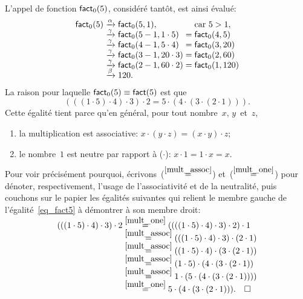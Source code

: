 L'appel de fonction \(\textsf{fact}_0(5)\), considéré tantôt, est ainsi
évalué:
\begin{equation*}
\begin{array}{r@{\;}c@{\;}l@{\;}c@{\;}l}
\fun{fact}_0(5)
& \xrightarrow{\smash[t]{\alpha}} & \fun{fact}_0(5,1),
&& \text{car \(5 > 1\)},\\
& \xrightarrow{\smash[t]{\gamma}} & \fun{fact}_0(5-1,1 \cdot 5)
& = & \fun{fact}_0(4,5)\\
& \xrightarrow{\smash[t]{\gamma}} & \fun{fact}_0(4-1,5 \cdot 4)
& = & \fun{fact}_0(3,20)\\
& \xrightarrow{\smash[t]{\gamma}} & \fun{fact}_0(3-1,20 \cdot 3)
& = & \fun{fact}_0(2,60)\\
& \xrightarrow{\smash[t]{\gamma}} & \fun{fact}_0(2-1,60 \cdot 2)
& = & \fun{fact}_0(1,120)\\
& \xrightarrow{\smash[t]{\beta}} & 120.
\end{array}
\end{equation*}
La raison pour laquelle \(\textsf{fact}_0(5) \equiv \textsf{fact}(5)\) est
que
\begin{equation}
  (((1 \cdot 5) \cdot 4) \cdot 3) \cdot 2
= 5 \cdot (4 \cdot (3 \cdot (2 \cdot 1))).\label{eq_fact5}
\end{equation}
Cette égalité tient parce qu'en général, pour tout nombre~\(x\), \(y\)~et~\(z\),
\begin{enumerate}

\item \label{mult_assoc} la multiplication est associative: \(x \cdot
  (y \cdot z) = (x \cdot y) \cdot z\);

\item \label{mult_one} le nombre~\(1\) est neutre par rapport à
  (\(\cdot\)): \(x \cdot 1 = 1 \cdot x = x\).

\end{enumerate}
Pour voir précisément pourquoi, écrivons~(\(\mathrel{\stackrel{\smash{\ref{mult_assoc}}}{=}}\))
et~(\(\mathrel{\stackrel{\smash{\ref{mult_one}}}{=}}\)) pour dénoter, respectivement, l'usage de
l'associativité et de la neutralité, puis couchons sur le papier les
égalités suivantes qui relient le membre gauche de
l'égalité~\eqref{eq_fact5} à démontrer à son membre droit:
\begin{align*}
  (((1 \cdot 5) \cdot 4) \cdot 3) \cdot 2
  &\mathrel{\stackrel{\smash{\smash{\ref{mult_one}}}}{=}} ((((1 \cdot 5) \cdot 4) \cdot 3) \cdot
  2) \cdot 1\\
  &\mathrel{\stackrel{\smash{\smash{\ref{mult_assoc}}}}{=}} (((1 \cdot 5) \cdot 4) \cdot 3)
  \cdot (2 \cdot 1)\\
  &\mathrel{\stackrel{\smash{\smash{\ref{mult_assoc}}}}{=}} ((1 \cdot 5) \cdot 4) \cdot (3 \cdot (2
    \cdot 1))\\
  &\mathrel{\stackrel{\smash{\smash{\ref{mult_assoc}}}}{=}} (1 \cdot 5) \cdot (4 \cdot (3 \cdot
  (2 \cdot 1))\\
  &\mathrel{\stackrel{\smash{\smash{\ref{mult_assoc}}}}{=}} 1 \cdot (5 \cdot (4 \cdot (3 \cdot
  (2 \cdot 1))))\\
  &\mathrel{\stackrel{\smash{\smash{\ref{mult_one}}}}{=}} 5 \cdot (4 \cdot (3 \cdot (2 \cdot
  1))).\quad \Box
\end{align*}
